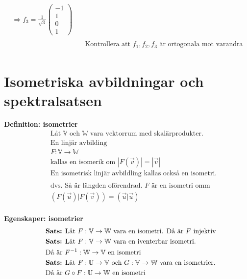 \begin{align*}
  \Rightarrow  f_3 = \frac{1}{\sqrt{3}}\begin{pmatrix} -1 \\ 1 \\ 0 \\ 1 \end{pmatrix} \\
  &\quad  \\
  &\quad  \text{Kontrollera att $f_1, f_2, f_3$ är ortogonala mot varandra} \\
\end{align*}


\newpage

\section{Isometriska avbildningar och spektralsatsen}
\textbf{Definition: isometrier}
\begin{align*}
  &\quad  \text{Låt $\mathbb{V}$ och $\mathbb{W}$ vara vektorrum med skalärprodukter. } \\
  &\quad  \text{En linjär avbilding} \\
  &\quad  F:\mathbb{V}\to\mathbb{W} \\
  &\quad  \text{kallas en isomerik om } |F(\vec{v})| = |\vec{v}| \\
  &\quad  \text{En isometrisk linjär avbildling kallas också en isometri.} \\
  &\quad  \\
  &\quad  \text{dvs. Så är längden oförendrad. $F$ är en isometri omm } \\
  &\quad  (F(\vec{u})|F(\vec{v})) = (\vec{u}|\vec{u}) \\
\end{align*}

\textbf{Egenskaper: isometrier}
\begin{align*}
  &\quad  \text{\textbf{Sats:} Låt $F:\mathbb{V}\to\mathbb{W}$ vara en isometri. Då är $F$ injektiv} \\
  &\quad  \text{\textbf{Sats:} Låt $F:\mathbb{V}\to\mathbb{W}$ vara en iventerbar isometri.} \\
  &\quad  \text{Då är $F^{-1}:\mathbb{W}\to\mathbb{V}$ en isometri} \\
  &\quad  \text{\textbf{Sats:} Låt $F:\mathbb{U}\to\mathbb{V}$ och $G:\mathbb{V}\to\mathbb{W}$ vara en isometrier.} \\
  &\quad  \text{Då är $G\circ{F}:\mathbb{U}\to\mathbb{W}$ en isometri} \\
\end{align*}


